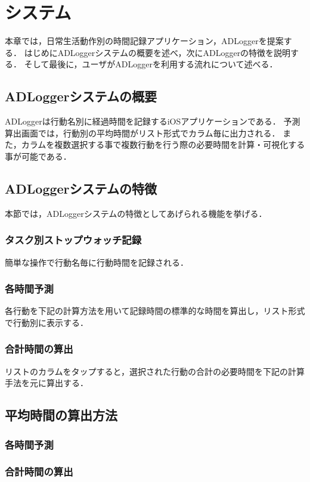 \chapter{システム}
本章では，日常生活動作別の時間記録アプリケーション，ADLoggerを提案する．
はじめにADLoggerシステムの概要を述べ，次にADLoggerの特徴を説明する．
そして最後に，ユーザがADLoggerを利用する流れについて述べる．

\section{ADLoggerシステムの概要}
ADLoggerは行動名別に経過時間を記録するiOSアプリケーションである．
予測算出画面では，行動別の平均時間がリスト形式でカラム毎に出力される．
また，カラムを複数選択する事で複数行動を行う際の必要時間を計算・可視化する事が可能である．

\section{ADLoggerシステムの特徴}
本節では，ADLoggerシステムの特徴としてあげられる機能を挙げる．
\subsection{タスク別ストップウォッチ記録}
簡単な操作で行動名毎に行動時間を記録される．
\subsection{各時間予測}
各行動を下記の計算方法を用いて記録時間の標準的な時間を算出し，リスト形式で行動別に表示する．
\subsection{合計時間の算出}
リストのカラムをタップすると，選択された行動の合計の必要時間を下記の計算手法を元に算出する．
\section{平均時間の算出方法}
\subsection{各時間予測}

\subsection{合計時間の算出}




